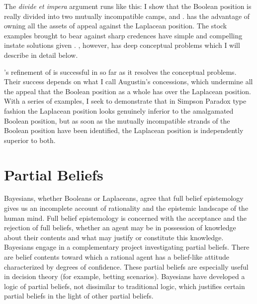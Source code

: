 \documentclass[phd,12pt,oneside]{ubcthesis}
\begin{document}
The \emph{divide et impera} argument runs like this: I show that the
Boolean position is really divided into two mutually incompatible
camps, {\anderson} and {\augustin}. {\anderson} has the advantage of
owning all the assets of appeal against the Laplacean position. The
stock examples brought to bear against sharp credences have simple and
compelling instate solutions given {\anderson}. {\anderson}, however,
has deep conceptual problems which I will describe in detail below.

{\augustin}'s refinement of {\anderson} is successful in so far as it
resolves the conceptual problems. Their success depends on what I call
Augustin's concessions, which undermine all the appeal that the
Boolean position as a whole has over the Laplacean position. With a
series of examples, I seek to demonstrate that in Simpson Paradox type
fashion the Laplacean position looks genuinely inferior to the
amalgamated Boolean position, but as soon as the mutually incompatible
strands of the Boolean position have been identified, the Laplacean
position is independently superior to both.

\section{Partial Beliefs}
\label{sec:taishiev}

Bayesians, whether Booleans or Laplaceans, agree that full belief
epistemology gives us an incomplete account of rationality and the
epistemic landscape of the human mind. Full belief epistemology is
concerned with the acceptance and the rejection of full beliefs,
whether an agent may be in possession of knowledge about their
contents and what may justify or constitute this knowledge. Bayesians
engage in a complementary project investigating partial beliefs. There
are belief contents toward which a rational agent has a belief-like
attitude characterized by degrees of confidence. These partial beliefs
are especially useful in decision theory (for example, betting
scenarios). Bayesians have developed a logic of partial beliefs, not
dissimilar to traditional logic, which justifies certain partial
beliefs in the light of other partial beliefs.
\end{document}
